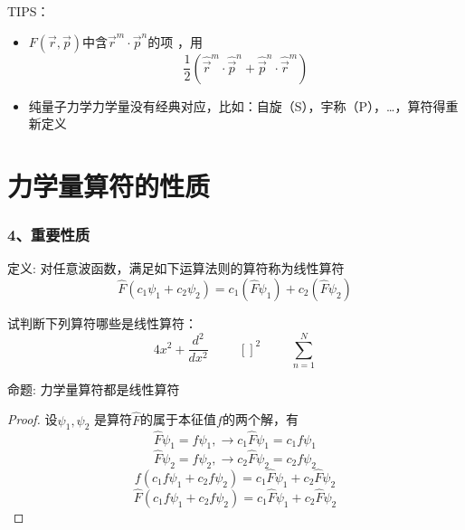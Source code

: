 \begin{frame}   
    TIPS：
    \begin{itemize}
        \item  $F(\vec{r},\vec{p})$中含$\vec{r}^m\cdot\vec{p}^n$的项 ，用$$\frac{1}{2}(\hat{\vec{r}}^m\cdot\hat{\vec{p}}^n+\hat{\vec{p}}^n\cdot\hat{\vec{r}}^m) $$
        \item  纯量子力学力学量没有经典对应，比如：自旋（S），宇称（P），\dots，算符得重新定义
    \end{itemize}
\end{frame} 

\section{力学量算符的性质}

\begin{frame} [allowframebreaks=]
    \frametitle{4、重要性质}
    \begin{tcolorbox1}{定义:}
        对任意波函数，满足如下运算法则的算符称为线性算符\\
        $$\hat{F}(c_1\psi_1+c_2\psi_2 ) = c_1(\hat{F}\psi_1)+c_2(\hat{F}\psi_2 )$$
    \end{tcolorbox1}
    试判断下列算符哪些是线性算符：\\
    $$4x^2+\frac{d^2}{dx^2} \hspace{1cm}  []^2 \hspace{1cm} \sum\limits_{n=1}^{N}$$
\end{frame} 

\begin{frame} [allowframebreaks=]
    \begin{tcolorbox1}{命题:}
      力学量算符都是线性算符  
    \end{tcolorbox1}
    \begin{proof}
        设$\psi_1, \psi_2$ 是算符$\hat{F}$的属于本征值$f$的两个解，有\\
        $$\hat{F}\psi_1=f\psi_1, \to c_1\hat{F}\psi_1=c_1f\psi_1 $$
        $$\hat{F}\psi_2=f\psi_2, \to c_2\hat{F}\psi_2=c_2f\psi_2 $$
        $$f(c_1f\psi_1+c_2f\psi_2)=c_1\hat{F}\psi_1+c_2\hat{F}\psi_2$$
        $$\hat{F}(c_1f\psi_1+c_2f\psi_2)=c_1\hat{F}\psi_1+c_2\hat{F}\psi_2$$
    \end{proof}
\end{frame} 

